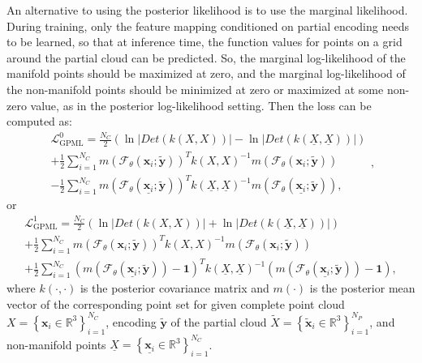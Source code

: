             An alternative to using the posterior likelihood is to use the marginal likelihood. During training, only the feature mapping conditioned on partial encoding needs to be learned, so that at inference time, the function values for points on a grid around the partial cloud can be predicted. So, the marginal log-likelihood of the manifold points should be maximized at zero, and the marginal log-likelihood of the non-manifold points should be minimized at zero or maximized at some non-zero value, as in the posterior log-likelihood setting. Then the loss can be computed as:
            \begin{equation}\label{GPMLLoss1}
                \begin{aligned}
                    \mathcal{L}^0_{\text{GPML}} = \frac{N_C}{2}(\ln |Det(k(X, X))| -\ln |Det(k(\underline{X}, \underline{X}))|)
                    \\
                    + \frac{1}{2}\sum_{i=1}^{N_C} m \left(\mathcal{F}_\theta(\mathbf{x}_i; \mathbf{\tilde{y}})\right)^T k(X, X)^{-1} m\left(\mathcal{F}_\theta(\mathbf{x}_i; \mathbf{\tilde{y}})\right)
                    \\
                    - \frac{1}{2}\sum_{i=1}^{N_C} m \left(\mathcal{F}_\theta(\underline{\mathbf{x}_i}; \mathbf{\tilde{y}})\right)^T k(\underline{X}, \underline{X})^{-1} m \left(\mathcal{F}_\theta(\underline{\mathbf{x}_i}; \mathbf{\tilde{y}})\right),
                \end{aligned},
            \end{equation}
            or
            \begin{equation}\label{GPMLLoss2}
                \begin{aligned}
                    \mathcal{L}^1_{\text{GPML}} = \frac{N_C}{2}(\ln |Det(k(X, X))| +\ln |Det(k(\underline{X}, \underline{X}))|)
                    \\
                    + \frac{1}{2}\sum_{i=1}^{N_C} m \left(\mathcal{F}_\theta(\mathbf{x}_i; \mathbf{\tilde{y}})\right)^T k(X, X)^{-1} m\left(\mathcal{F}_\theta(\mathbf{x}_i; \mathbf{\tilde{y}})\right)
                    \\
                    + \frac{1}{2}\sum_{i=1}^{N_C} \left(m \left(\mathcal{F}_\theta(\underline{\mathbf{x}_i}; \mathbf{\tilde{y}})\right)-\mathbf{1}\right)^T k(\underline{X}, \underline{X})^{-1} \left(m \left(\mathcal{F}_\theta(\underline{\mathbf{x}_i}; \mathbf{\tilde{y}})\right)-\mathbf{1}\right),
                \end{aligned}
            \end{equation}
            where $k(\cdot, \cdot)$ is the posterior covariance matrix and $m(\cdot)$ is the posterior mean vector of the corresponding point set for given complete point cloud $X=\left\{\mathbf{x}_{i} \in \mathbb{R}^{3}\right\}_{i=1}^{N_C}$, encoding $\mathbf{\tilde{y}}$ of the partial cloud $\tilde{X}=\left\{\mathbf{\tilde{x}}_{i} \in \mathbb{R}^{3}\right\}_{i=1}^{N_P}$, and non-manifold points $\underline{X}=\left\{\underline{\mathbf{x}_i} \in \mathbb{R}^{3}\right\}_{i=1}^{N_C}$.
            \newline

